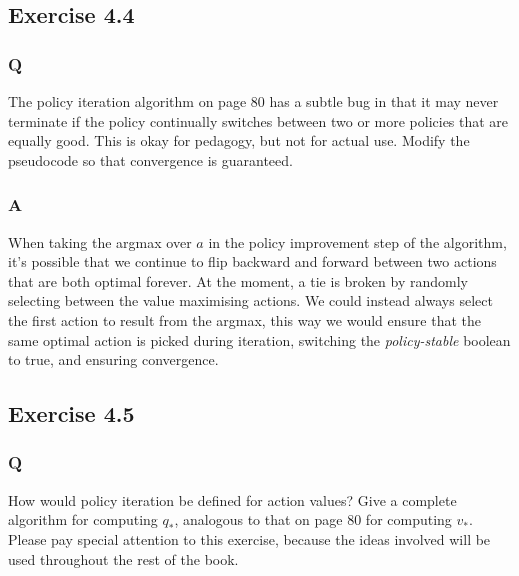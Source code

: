 \subsection{Exercise 4.4}
\subsubsection{Q}
The policy iteration algorithm on page 80 has a subtle bug in that it may never terminate if the policy continually switches between two or more policies that are equally good. This is okay for pedagogy, but not for actual use. Modify the pseudocode so that convergence is guaranteed.
\subsubsection{A}
When taking the argmax over $a$ in the policy improvement step of the algorithm, it's possible that we continue to flip backward and forward between two actions that are both optimal forever. At the moment, a tie is broken by randomly selecting between the value maximising actions. We could instead always select the first action to result from the argmax, this way we would ensure that the same optimal action is picked during iteration, switching the \textit{policy-stable} boolean to true, and ensuring convergence.

\subsection{Exercise 4.5}
\subsubsection{Q}
How would policy iteration be defined for action values? Give a complete algorithm for computing $q_*$, analogous to that on page 80 for computing $v_*$. Please pay special attention to this exercise, because the ideas involved will be used throughout the rest of the book.
